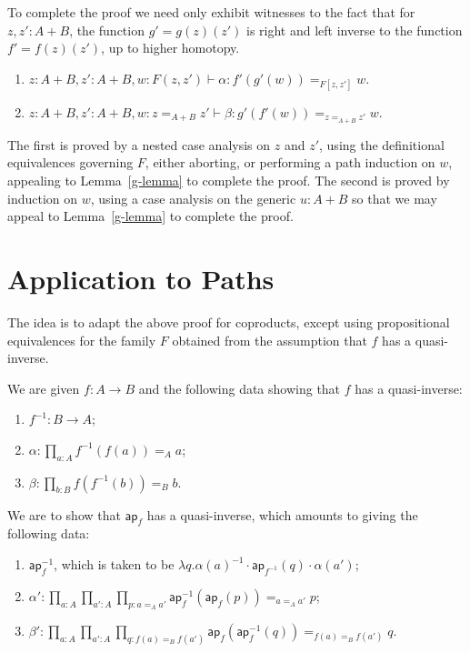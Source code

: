 \documentclass{article}
\newcommand{\sumty}[2]{{#1}+{#2}}
\newcommand{\idty}[3]{{#2}\mathbin{=_{#1}}{#3}}
\newcommand{\prodty}[3]{\prod_{{#1}{:}{#2}}{#3}}
\newcommand{\lam}[2]{\lambda {#1}{.}{#2}}
\newcommand{\app}[2]{{#1}({#2})}
\newcommand{\pa}[1]{\mathsf{ap}_{#1}}
\newcommand{\iv}[1]{#1^{-1}}
\newcommand{\concat}[2]{{#1}\cdot{#2}}
\begin{document}
To complete the proof we need only exhibit witnesses to the fact that for $z,z':\sumty{A}{B}$, the function  $g'=\app{\app{g}{z}}{z'}$ is right and left inverse to the function $f'=\app{\app{f}{z}}{z'}$, up to higher homotopy.
\begin{enumerate}
\item $z:\sumty{A}{B},z':\sumty{A}{B},w:F(z,z')\vdash \alpha : \idty{F[z,z']}{\app{f'}{\app{g'}{w}}}{w}$.
\item $z:\sumty{A}{B},z':\sumty{A}{B},w:\idty{\sumty{A}{B}}{z}{z'}\vdash \beta : \idty{\idty{\sumty{A}{B}}{z}{z'}}{\app{g'}{\app{f'}{w}}}{w}$.
\end{enumerate}

The first is proved by a nested case analysis on $z$ and $z'$, using the definitional equivalences governing $F$, either aborting, or performing a path induction on $w$, appealing to Lemma~\ref{g-lemma} to complete the proof.  The second is proved by induction on $w$, using a case analysis on the generic $u:\sumty{A}{B}$ so that we may appeal to Lemma~\ref{g-lemma} to complete the proof.

\section{Application to Paths}

The idea is to adapt the above proof for coproducts, except using propositional equivalences for the family $F$ obtained from the assumption that $f$ has a quasi-inverse.

We are given $f:A\to B$ and the following data showing that $f$ has a quasi-inverse:
\begin{enumerate}
\item $\iv{f}:B\to A$;
\item $\alpha:\prodty{a}{A}{\idty{A}{\app{\iv{f}}{\app{f}{a}}}{a}}$;
\item $\beta:\prodty{b}{B}{\idty{B}{\app{f}{\app{\iv{f}}{b}}}{b}}$.
\end{enumerate}

We are to show that $\pa{f}$ has a quasi-inverse, which amounts to giving the following data:
\begin{enumerate}
\item $\iv{\pa{f}}$, which is taken to be $\lam{q}{\concat{\concat{\iv{\app{\alpha}{a}}}{\app{\pa{\iv{f}}}{q}}}{\app{\alpha}{a'}}}$;
\item $\alpha':\prodty{a}{A}{\prodty{a'}{A}{\prodty{p}{\idty{A}{a}{a'}}{\idty{\idty{A}{a}{a'}}{\app{\iv{\pa{f}}}{\app{\pa{f}}{p}}}{p}}}}$;
\item $\beta':\prodty{a}{A}{\prodty{a'}{A}{\prodty{q}{\idty{B}{\app{f}{a}}{\app{f}{a'}}}{\idty{\idty{B}{\app{f}{a}}{\app{f}{a'}}}{\app{\pa{f}}{\app{\iv{\pa{f}}}{q}}}{q}}}}$.
\end{enumerate}
\end{document}
